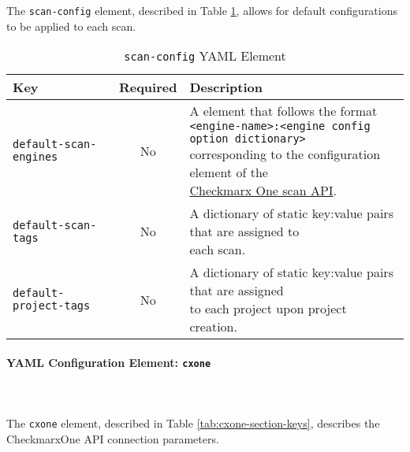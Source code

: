 \noindent\\\\The \texttt{scan-config} element, described in Table \ref{tab:scan-config-section-keys}, allows for default configurations to be applied to each scan.

\begin{table}[h]
    \caption{\texttt{scan-config} YAML Element}  
    \label{tab:scan-config-section-keys}      
    \begin{tabularx}{\textwidth}{lcl}
        \toprule
        \textbf{Key} & \textbf{Required} & \textbf{Description}\\
        \midrule
        \texttt{default-scan-engines} & No & \makecell[l]{A element that follows the format\\\texttt{<engine-name>:<engine config option dictionary>}\\corresponding to the configuration element of the\\\href{https://checkmarx.stoplight.io/docs/checkmarx-one-api-reference-guide/branches/main/f601dd9456e80-run-a-scan}{Checkmarx One scan API}.}\\
        \midrule
        \texttt{default-scan-tags} & No &  \makecell[l]{A dictionary of static key:value pairs that are assigned to\\each scan.}\\
        \midrule
        \texttt{default-project-tags} & No & \makecell[l]{A dictionary of static key:value pairs that are assigned\\to each project upon project creation.}\\
        \bottomrule
    \end{tabularx}
\end{table}


\paragraph{YAML Configuration Element: \texttt{cxone} }\label{sec:cxone-element}

\noindent\\\\The \texttt{cxone} element, described in Table \ref{tab:cxone-section-keys}, 
describes the CheckmarxOne API connection parameters.


